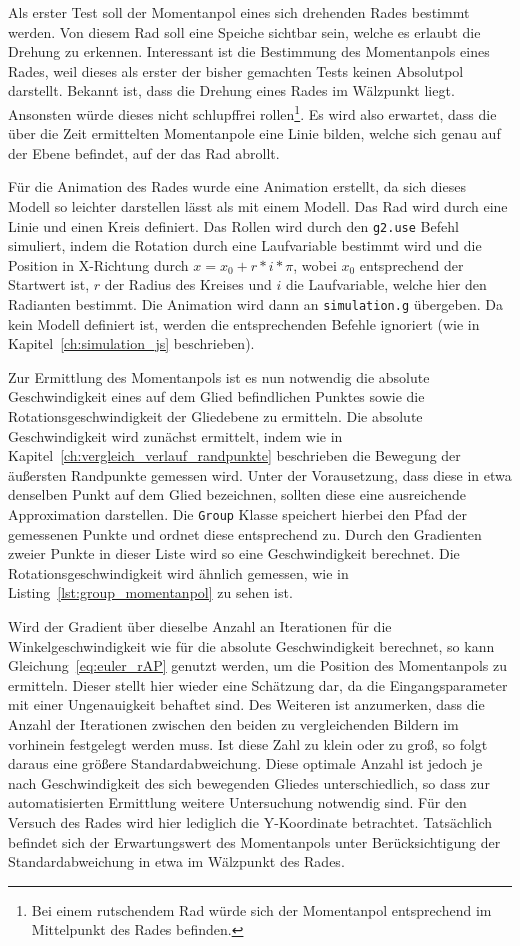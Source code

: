 Als erster Test soll der Momentanpol eines sich drehenden Rades bestimmt werden.
Von diesem Rad soll eine Speiche sichtbar sein, welche es erlaubt die Drehung zu erkennen.
Interessant ist die Bestimmung des Momentanpols eines Rades, weil dieses als erster der bisher gemachten Tests keinen Absolutpol darstellt.
Bekannt ist, dass die Drehung eines Rades im Wälzpunkt liegt.
Ansonsten würde dieses nicht schlupffrei rollen\footnote{Bei einem rutschendem Rad würde sich der Momentanpol entsprechend im Mittelpunkt des Rades befinden.}.
Es wird also erwartet, dass die über die Zeit ermittelten Momentanpole eine Linie bilden, welche sich genau auf der Ebene befindet, auf der das Rad abrollt.

Für die Animation des Rades wurde eine  Animation erstellt,
da sich dieses Modell so leichter darstellen lässt als mit einem  Modell.
Das Rad wird durch eine Linie und einen Kreis definiert.
Das Rollen wird durch den \lstinline{g2.use} Befehl simuliert, indem die Rotation durch eine Laufvariable bestimmt wird und die Position in X-Richtung durch $x = x_0 + r * i * \pi$, wobei $x_0$ entsprechend der Startwert ist, $r$ der Radius des Kreises und $i$ die Laufvariable, welche hier den Radianten bestimmt.
Die Animation wird dann an \lstinline{simulation.g} übergeben.
Da kein  Modell definiert ist, werden die entsprechenden Befehle ignoriert (wie in Kapitel~\ref{ch:simulation_js} beschrieben).

Zur Ermittlung des Momentanpols ist es nun notwendig die absolute Geschwindigkeit eines auf dem Glied befindlichen Punktes sowie die Rotationsgeschwindigkeit der Gliedebene zu ermitteln.
Die absolute Geschwindigkeit wird zunächst ermittelt, indem wie in Kapitel~\ref{ch:vergleich_verlauf_randpunkte} beschrieben die Bewegung der äu{\ss}ersten Randpunkte gemessen wird.
Unter der Vorausetzung, dass diese in etwa denselben Punkt auf dem Glied bezeichnen, sollten diese eine ausreichende Approximation darstellen.
Die \lstinline{Group} Klasse speichert hierbei den Pfad der gemessenen Punkte und ordnet diese entsprechend zu.
Durch den Gradienten zweier Punkte in dieser Liste wird so eine Geschwindigkeit berechnet.
Die Rotationsgeschwindigkeit wird ähnlich gemessen, wie in Listing~\ref{lst:group_momentanpol} zu sehen ist.

Wird der Gradient über dieselbe Anzahl an Iterationen für die Winkelgeschwindigkeit wie für die absolute Geschwindigkeit berechnet, so kann Gleichung~\ref{eq:euler_rAP} genutzt werden, um die Position des Momentanpols zu ermitteln.
Dieser stellt hier wieder eine Schätzung dar, da die Eingangsparameter mit einer Ungenauigkeit behaftet sind.
Des Weiteren ist anzumerken, dass die Anzahl der Iterationen zwischen den beiden zu vergleichenden Bildern im vorhinein festgelegt werden muss.
Ist diese Zahl zu klein oder zu gro{\ss}, so folgt daraus eine grö{\ss}ere Standardabweichung.
Diese optimale Anzahl ist jedoch je nach Geschwindigkeit des sich bewegenden Gliedes unterschiedlich, so dass zur automatisierten Ermittlung weitere Untersuchung notwendig sind.
Für den Versuch des Rades wird hier lediglich die Y-Koordinate betrachtet.
Tatsächlich befindet sich der Erwartungswert des Momentanpols unter Berücksichtigung der Standardabweichung in etwa im Wälzpunkt des Rades.

